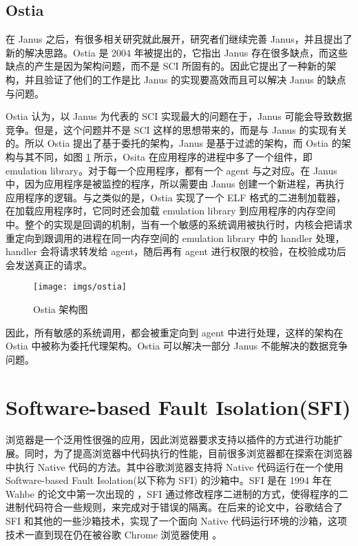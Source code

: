 \subsection{Ostia}
\label{sss:ostia}

在 Janus 之后，有很多相关研究就此展开，研究者们继续完善 Janus，并且提出了新的解决思路。Ostia \parencite{garfinkel} 是 2004 年被提出的，它指出 Janus 存在很多缺点，而这些缺点的产生是因为架构问题，而不是 SCI 所固有的。因此它提出了一种新的架构，并且验证了他们的工作是比 Janus 的实现要高效而且可以解决 Janus 的缺点与问题。

Ostia 认为，以  Janus 为代表的 SCI 实现最大的问题在于，Janus 可能会导致数据竞争。但是，这个问题并不是 SCI 这样的思想带来的，而是与 Janus 的实现有关的。所以 Ostia 提出了基于委托的架构，Janus 是基于过滤的架构，而 Ostia 的架构与其不同，如图 \ref{fig:ostia} 所示，Osita 在应用程序的进程中多了一个组件，即 emulation library。对于每一个应用程序，都有一个 agent 与之对应。在 Janus 中，因为应用程序是被监控的程序，所以需要由 Janus 创建一个新进程，再执行应用程序的逻辑。与之类似的是，Ostia 实现了一个 ELF 格式的二进制加载器，在加载应用程序时，它同时还会加载 emulation library 到应用程序的内存空间中。整个的实现是回调的机制，当有一个敏感的系统调用被执行时，内核会把请求重定向到跟调用的进程在同一内存空间的 emulation library 中的 handler 处理，handler 会将请求转发给 agent，随后再有 agent 进行权限的校验，在校验成功后会发送真正的请求。

\begin{figure}[!htp]
  \centering
  \texttt{[image: imgs/ostia]}
  \caption{Ostia 架构图}
  \label{fig:ostia}
\end{figure}

因此，所有敏感的系统调用，都会被重定向到 agent 中进行处理，这样的架构在 Ostia 中被称为委托代理架构。Ostia 可以解决一部分 Janus 不能解决的数据竞争问题。

\section{Software-based Fault Isolation(SFI)}
\label{ss:sfi}

浏览器是一个泛用性很强的应用，因此浏览器要求支持以插件的方式进行功能扩展。同时，为了提高浏览器中代码执行的性能，目前很多浏览器都在探索在浏览器中执行 Native 代码的方法。其中谷歌浏览器支持将 Native 代码运行在一个使用 Software-based Fault Isolation(以下称为 SFI) 的沙箱中。SFI 是在 1994 年在 Wahbe 的论文中第一次出现的 \parencite{wahbe1994efficient}，SFI 通过修改程序二进制的方式，使得程序的二进制代码符合一些规则，来完成对于错误的隔离。在后来的论文中，谷歌结合了 SFI 和其他的一些沙箱技术，实现了一个面向 Native 代码运行环境的沙箱，这项技术一直到现在仍在被谷歌 Chrome 浏览器使用 \parencite{nacl}。

